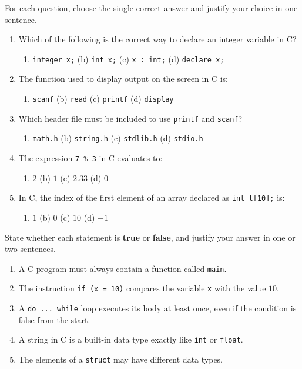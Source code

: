 \documentclass[11pt]{article}
\begin{document}
\begin{exercice}
For each question, choose the single correct answer and justify your choice in one sentence.
\begin{enumerate}
\item Which of the following is the correct way to declare an integer variable in C?
\begin{enumerate}
\item \texttt{integer x;} \quad (b) \texttt{int x;} \quad (c) \texttt{x : int;} \quad (d) \texttt{declare x;}
\end{enumerate}
\item The function used to display output on the screen in C is:
\begin{enumerate}
\item \texttt{scanf} \quad (b) \texttt{read} \quad (c) \texttt{printf} \quad (d) \texttt{display}
\end{enumerate}
\item Which header file must be included to use \texttt{printf} and \texttt{scanf}?
\begin{enumerate}
\item \texttt{math.h} \quad (b) \texttt{string.h} \quad (c) \texttt{stdlib.h} \quad (d) \texttt{stdio.h}
\end{enumerate}
\item The expression \texttt{7 \% 3} in C evaluates to:
\begin{enumerate}
\item $2$ \quad (b) $1$ \quad (c) $2.33$ \quad (d) $0$
\end{enumerate}
\item In C, the index of the first element of an array declared as \texttt{int t[10];} is:
\begin{enumerate}
\item $1$ \quad (b) $0$ \quad (c) $10$ \quad (d) $-1$
\end{enumerate}
\end{enumerate}
\end{exercice}

\begin{exercice}
State whether each statement is \textbf{true} or \textbf{false}, and justify your answer in one or two sentences.
\begin{enumerate}
\item A C program must always contain a function called \texttt{main}.
\item The instruction \texttt{if (x = 10)} compares the variable \texttt{x} with the value $10$.
\item A \texttt{do ... while} loop executes its body at least once, even if the condition is false from the start.
\item A string in C is a built-in data type exactly like \texttt{int} or \texttt{float}.
\item The elements of a \texttt{struct} may have different data types.
\end{enumerate}
\end{exercice}
\end{document}
